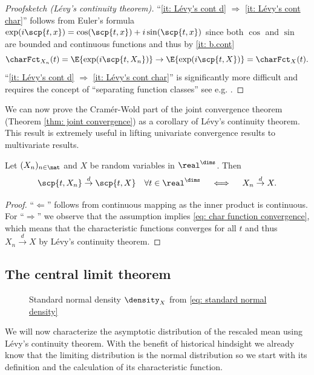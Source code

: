 \begin{proof}[Proofsketch (Lévy's continuity theorem)]
    ``\ref{it: Lévy's cont d} \(\Rightarrow\) \ref{it: Lévy's cont char}''
    follows from Euler's formula \(\exp(i\scp{t, x}) = \cos(\scp{t, x}) + i \sin(\scp{t, x})\) since both \(\cos\) and \(\sin\) 
    are bounded and continuous functions and thus by \ref{it: b.cont}
    \begin{equation}
        \label{eq: char function convergence}    
        \charFct_{X_n}(t)
        = \E{\exp(i\scp{t, X_n})}
        \to \E{\exp(i\scp{t, X})}
        = \charFct_X(t).
    \end{equation}
    ``\ref{it: Lévy's cont d} \(\Rightarrow\) \ref{it: Lévy's cont char}'' is significantly
    more difficult and requires the concept of ``separating function classes''
    see e.g.
    \citep{klenkeProbabilityTheoryComprehensive2014,kallenbergFoundationsModernProbability2002}.
\end{proof}

We can now prove the Cramér-Wold part of the joint convergence theorem (Theorem
\ref{thm: joint convergence}) as a corollary of Lévy's continuity theorem.
This result is extremely useful in lifting univariate convergence results to
multivariate results.

\begin{corollary}
    \label{cor: cramer wold}
    Let \((X_n)_{n\in \nat}\) and \(X\) be random variables in \(\real^\dims\). Then
    \[
        \scp{t, X_n} \overset{d}\to \scp{t, X} \quad \forall t \in \real^\dims
        \quad \iff \quad
        X_n \overset{d}\to X.
    \]
\end{corollary}
\begin{proof}
    ``\(\Leftarrow\)'' follows from continuous mapping as the inner product
    is continuous. For ``\(\Rightarrow\)'' we observe that the assumption
    implies \eqref{eq: char function convergence},
    which means that the characteristic functions converges for all
    \(t\) and thus \(X_n \overset{d}\to X\) by Lévy's continuity theorem.
\end{proof}

\subsection{The central limit theorem}

\begin{figure}
    \vspace{-2em}
    \scalebox{0.7}{
    
    }
    \caption{Standard normal density \(\density_X\) from \eqref{eq: standard normal density}}
\end{figure} 
We will now characterize the asymptotic distribution of the rescaled mean using
Lévy's continuity theorem. With the benefit of historical hindsight we already
know that the limiting distribution is the normal distribution so we start
with its definition and the calculation of its characteristic function.

